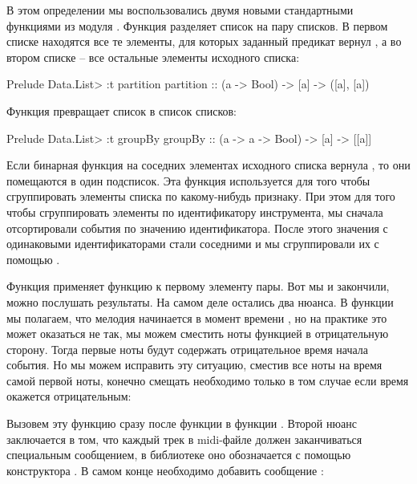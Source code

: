В этом определении мы воспользовались двумя новыми 
стандартными функциями из модуля .
Функция  разделяет список на пару списков.
В первом списке находятся все те элементы, для которых 
заданный предикат вернул , а во втором списке -- 
все остальные элементы исходного списка:

\begin{code}
Prelude Data.List> :t partition
partition :: (a -> Bool) -> [a] -> ([a], [a])
\end{code}

Функция  превращает список в список списков:

\begin{code}
Prelude Data.List> :t groupBy
groupBy :: (a -> a -> Bool) -> [a] -> [[a]]
\end{code}

Если бинарная функция на соседних элементах исходного
списка вернула , то они помещаются в один подсписок.
Эта функция используется для того чтобы сгруппировать элементы
списка по какому-нибудь признаку. При этом для того чтобы 
сгруппировать элементы по идентификатору инструмента, мы сначала
отсортировали события по значению идентификатора. После этого
значения с одинаковыми идентификаторами стали соседними
и мы сгруппировали их с помощью . 

Функция  применяет функцию к первому элементу пары.
Вот мы и закончили, можно послушать результаты. На самом деле 
остались два нюанса. В функции  мы полагаем,
что мелодия начинается в момент времени , но на 
практике это может оказаться не так, мы можем сместить ноты
функцией  в отрицательную сторону. Тогда первые
ноты будут содержать отрицательное время начала события. 
Но мы можем исправить эту ситуацию, сместив все ноты на
время самой первой ноты, конечно смещать необходимо только
в том случае если время окажется отрицательным:


Вызовем эту функцию сразу после функции 
в функции . Второй нюанс заключается в том,
что каждый трек в midi-файле должен заканчиваться специальным
сообщением, в библиотеке  оно обозначается
с помощью конструктора . В самом конце
необходимо добавить сообщение :

